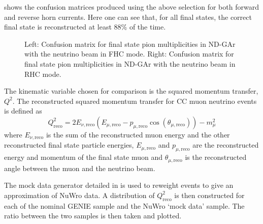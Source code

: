  shows the confusion matrices produced using the above selection for both forward and reverse horn currents. 
Here one can see that, for all final states, the correct final state is reconstructed at least 88\% of the time.

\begin{figure}[h]
	\begin{minipage}[t]{.5\linewidth}
		\begin{adjustbox}{max totalsize=\linewidth, center}
			
		\end{adjustbox}
	\end{minipage}
	\hfill
	\begin{minipage}[t]{.5\linewidth}
		\begin{adjustbox}{max totalsize=\linewidth, center}
			
		\end{adjustbox}
	\end{minipage}
	\caption[Confusion matrices for final state pion multiplicities in ND-GAr]{Left: Confusion matrix for final state pion multiplicities in ND-GAr with the neutrino beam in FHC mode. Right: Confusion matrix for final state pion multiplicities in ND-GAr with the neutrino beam in RHC mode.}
	\label{fig:confusMatPi}
\end{figure}

The kinematic variable chosen for comparison is the squared momentum transfer, $Q^{2}$.
The reconstructed squared momentum transfer for CC muon neutrino events is defined as
\begin{equation}
Q^{2}_{\textrm{reco}} = 2E_{\nu, \textrm{reco}} \left( E_{\mu, \textrm{reco}} - p_{\mu, \textrm{reco}} \cos \left( \theta_{\mu, \textrm{reco}} \right) \right) - m_{\mu}^{2}
\end{equation}
where $E_{\nu, \textrm{reco}}$ is the sum of the reconstructed muon energy and the other reconstructed final state particle energies, $E_{\mu, \textrm{reco}}$ and $p_{\mu, \textrm{reco}}$ are the reconstructed energy and momentum of the final state muon and $\theta_{\mu, \textrm{reco}}$ is the reconstructed angle between the muon and the neutrino beam.

The mock data generator detailed in  is used to reweight events to give an approximation of NuWro data.
A distribution of $Q^{2}_{\textrm{reco}}$ is then constructed for each of the nominal GENIE sample and the NuWro `mock data' sample. 
The ratio between the two samples is then taken and plotted. 

